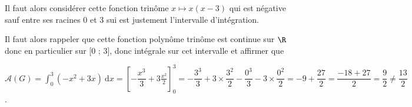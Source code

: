 \begin{enumerate}
		Il faut alors considérer cette fonction trinôme $x \longmapsto x(x - 3)$ qui est négative sauf entre ses racines 0 et 3 sui est justement l'intervalle d'intégration.

		Il faut alors rappeler que cette fonction polynôme trinôme est continue sur $\R$ donc en particulier sur [0 ; 3], donc intégrale sur cet intervalle et affirmer que

		$\mathcal{A}(G) = \displaystyle\int_0^3 \left(- x^2 + 3x \right)\:\text{d}x = \left[- \dfrac{x^3}{3} + 3\frac{x^2}{2} \right]_0^3 = -\dfrac{3^3}{3} + 3\times \dfrac{3^2}{2} - \dfrac{0^3}{3} - 3\times \dfrac{0^2}{2}  = -9 + \dfrac{27}{2} = \dfrac{-18 + 27}{2} = \dfrac92 \ne \dfrac{13}{2}$.
\end{enumerate}

